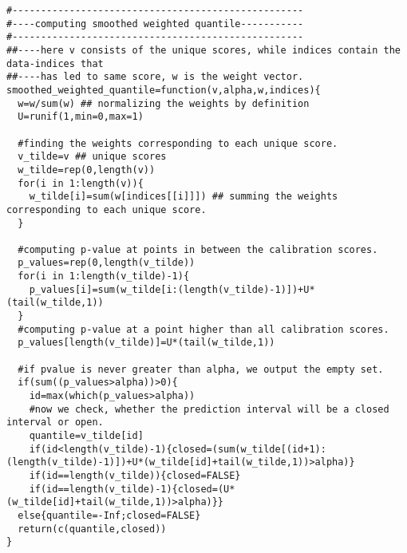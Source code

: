 \documentclass[UTF8, a4paper]{article}
\begin{document}
\begin{verbatim}
#---------------------------------------------------
#----computing smoothed weighted quantile-----------
#---------------------------------------------------
##----here v consists of the unique scores, while indices contain the data-indices that
##----has led to same score, w is the weight vector.
smoothed_weighted_quantile=function(v,alpha,w,indices){
  w=w/sum(w) ## normalizing the weights by definition
  U=runif(1,min=0,max=1)
  
  #finding the weights corresponding to each unique score.
  v_tilde=v ## unique scores
  w_tilde=rep(0,length(v))
  for(i in 1:length(v)){
    w_tilde[i]=sum(w[indices[[i]]]) ## summing the weights corresponding to each unique score.
  }
  
  #computing p-value at points in between the calibration scores.
  p_values=rep(0,length(v_tilde))
  for(i in 1:length(v_tilde)-1){
    p_values[i]=sum(w_tilde[i:(length(v_tilde)-1)])+U*(tail(w_tilde,1))
  }
  #computing p-value at a point higher than all calibration scores.
  p_values[length(v_tilde)]=U*(tail(w_tilde,1))
  
  #if pvalue is never greater than alpha, we output the empty set.
  if(sum((p_values>alpha))>0){
    id=max(which(p_values>alpha))
    #now we check, whether the prediction interval will be a closed interval or open.
    quantile=v_tilde[id]
    if(id<length(v_tilde)-1){closed=(sum(w_tilde[(id+1):(length(v_tilde)-1)])+U*(w_tilde[id]+tail(w_tilde,1))>alpha)}
    if(id==length(v_tilde)){closed=FALSE}
    if(id==length(v_tilde)-1){closed=(U*(w_tilde[id]+tail(w_tilde,1))>alpha)}}
  else{quantile=-Inf;closed=FALSE}
  return(c(quantile,closed))
}
\end{verbatim}


\medskip

\printbibliography
\end{document}
